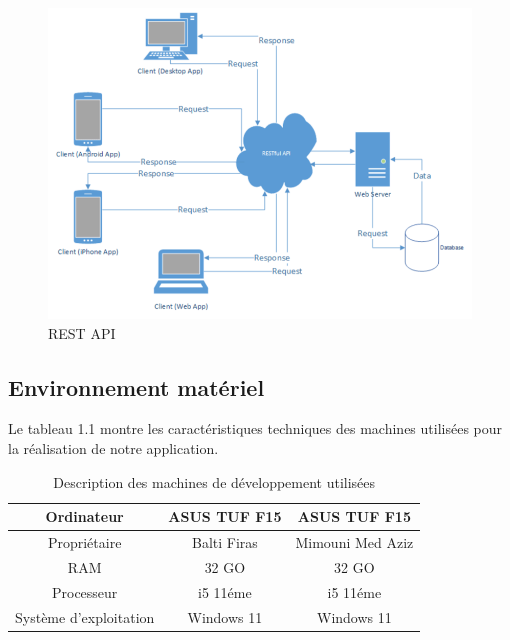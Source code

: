 \begin{itemize}
          \begin{figure}[ht]
              \centering\includegraphics[scale=0.4]{chap1.images/rest-api-flow.png}
              \caption{REST API}
              \label{RESTAPI}
          \end{figure}

\end{itemize}



\subsection{Environnement matériel}
\noindent Le tableau 1.1 montre les caractéristiques techniques des machines utilisées pour la réalisation de notre application.

\begin{table}[htbp]
    \renewcommand{\arraystretch}{1.5}
    \centering
    \begin{tabular}{|c|c|c|}
        \hline
        Ordinateur             & ASUS TUF F15 & ASUS TUF F15     \\
        \hline
        Propriétaire           & Balti Firas  & Mimouni Med Aziz \\
        \hline
        RAM                    & 32 GO        & 32 GO            \\
        \hline
        Processeur             & i5 11éme     & i5 11éme         \\
        \hline
        Système d’exploitation & Windows 11   & Windows 11       \\
        \hline
    \end{tabular}
    \bigskip
    \caption{Description des machines de développement utilisées}

\end{table}

